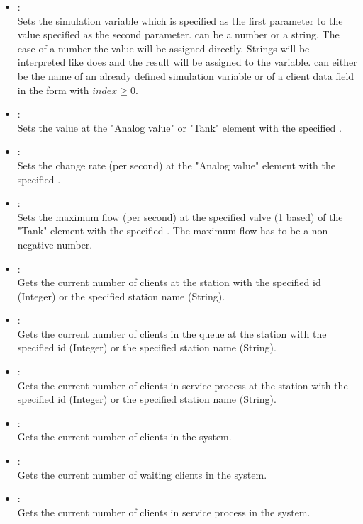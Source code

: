 \begin{itemize}

\item
{}:\\
Sets the simulation variable which is specified as the first parameter to the value specified as the second parameter.  
 can be a number or a string. The case of a number the value will be assigned directly.
Strings will be interpreted like  does and the result will be assigned to the variable. 
can either be the name of an already defined simulation variable or of a client data field in the form
 with $index\ge0$.

\item
{}:\\
Sets the value at the "Analog value" or "Tank" element with the specified .
  
\item
{}:\\
Sets the change rate (per second) at the "Analog value" element with the specified .
  
\item
{}:\\
Sets the maximum flow (per second) at the specified valve (1 based) of the "Tank" element
with the specified . The maximum flow has to be a non-negative number.  

\item
{}:\\
Gets the current number of clients at the station with the specified id (Integer) or the specified station name (String).
  
\item
{}:\\
Gets the current number of clients in the queue at the station with the specified id (Integer) or the specified station name (String).

\item
{}:\\
Gets the current number of clients in service process at the station with the specified id (Integer) or the specified station name (String).

\item
{}:\\
Gets the current number of clients in the system.
  
\item
{}:\\
Gets the current number of waiting clients in the system.

\item
{}:\\
Gets the current number of clients in service process in the system.

\end{itemize}

